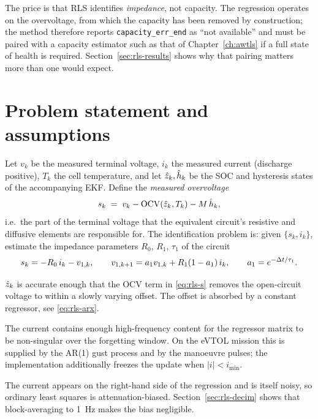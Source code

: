 The price is that RLS identifies \emph{impedance}, not capacity.  The regression operates on the
overvoltage, from which the capacity has been removed by construction; the method therefore reports
\texttt{capacity\_err\_end} as ``not available'' and must be paired with a capacity estimator such as
that of Chapter~\ref{ch:awtls} if a full state of health is required.  Section~\ref{sec:rls-results}
shows why that pairing matters more than one would expect.

\section{Problem statement and assumptions}
Let $v_k$ be the measured terminal voltage, $i_k$ the measured current (discharge positive), $T_k$
the cell temperature, and let $\hat{z}_k,\hat{h}_k$ be the SOC and hysteresis states of the
accompanying EKF.  Define the \emph{measured overvoltage}
\begin{equation}
s_k \;=\; v_k-\mathrm{OCV}(\hat{z}_k,T_k)-M\,\hat{h}_k ,
\label{eq:rls-s}
\end{equation}
i.e.\ the part of the terminal voltage that the equivalent circuit's resistive and diffusive
elements are responsible for.  The identification problem is: given
$\{s_k,i_k\}$, estimate the impedance parameters $R_0$, $R_1$, $\tau_1$ of the circuit
\begin{equation}
s_k=-R_0\,i_k-v_{1,k},\qquad v_{1,k+1}=a_1 v_{1,k}+R_1(1-a_1)\,i_k,\qquad a_1=e^{-\Delta t/\tau_1}.
\label{eq:rls-circuit}
\end{equation}

\begin{assumption}\label{as:rls-sep}
$\hat{z}_k$ is accurate enough that the OCV term in \eqref{eq:rls-s} removes the open-circuit
voltage to within a slowly varying offset.  The offset is absorbed by a constant regressor, see
\eqref{eq:rls-arx}.
\end{assumption}

\begin{assumption}\label{as:rls-pe}
The current contains enough high-frequency content for the regressor matrix to be non-singular over
the forgetting window.  On the eVTOL mission this is supplied by the AR(1) gust process and by the
manoeuvre pulses; the implementation additionally freezes the update when $|i|<i_{\min}$.
\end{assumption}

\begin{assumption}\label{as:rls-eiv}
The current appears on the right-hand side of the regression and is itself noisy, so ordinary least
squares is attenuation-biased.  Section~\ref{sec:rls-decim} shows that block-averaging to
\SI{1}{\hertz} makes the bias negligible.
\end{assumption}

